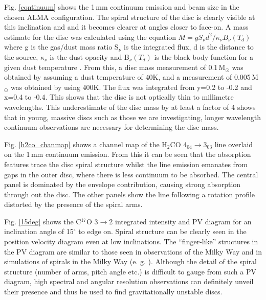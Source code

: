 \documentclass[useAMS,usenatbib]{mn2e}
\begin{document}
Fig. \ref{continuum} shows the 1\,mm continuum emission and beam size in the chosen ALMA configuration. The spiral structure of the disc is clearly visible at this inclination and and it becomes clearer at angles closer to face-on. A mass estimate for the disc was calculated using the equation $M=g S_\nu d^2/\kappa_\nu B_\nu(T_d)$ where g is the gas/dust mass ratio S$_\nu$ is the integrated flux, d is the distance to the source, $\kappa_\nu$ is the dust opacity and B$_\nu(T_d)$ is the black body function for a given dust temperature \citep{Beltran2006}. From this, a disc mass measurement of 0.1$\,$M$_\odot$ was obtained by assuming a dust temperature of 40K, and a measurement of 0.005$\,$M$_\odot$ was obtained by using 400K. The flux was integrated from y=0.2 to -0.2 and x=0.4 to -0.4. This shows that the disc is not optically thin to millimetre wavelengths. This underestimate of the disc mass by at least a factor of 4 shows that in young, massive discs such as those we are investigating, longer wavelength continuum observations are necessary for determining the disc mass.\smallskip

Fig. \ref{h2co_chanmap} shows a channel map of the H$_2$CO 4$_{04}\rightarrow$3$_{03}$ line overlaid on the 1$\,$mm continuum emission. From this it can be seen that the absorption features trace the disc spiral structure whilst the line emission emanates from gaps in the outer disc, where there is less continuum to be absorbed. The central panel is dominated by the envelope contribution, causing strong absorption through out the disc. The other panels show the line following a rotation profile distorted by the presence of the spiral arms. \smallskip

Fig. \ref{15deg} shows the C$^{17}$O 3$\rightarrow$2 integrated intensity and PV diagram for an inclination angle of 15$^\circ$ to edge on. Spiral structure can be clearly seen in the position velocity diagram even at low inclinations. The ``finger-like'' structures in the PV diagram are similar to those seen in observations of the Milky Way and in simulations of spirals in the Milky Way (e. g. \citealt{Bissantz2003}). Although the detail of the spiral structure (number of arms, pitch angle etc.) is difficult to gauge from such a PV diagram, high spectral and angular resolution observations can definitely unveil their presence and thus be used to find gravitationally unstable discs. \smallskip
\end{document}

